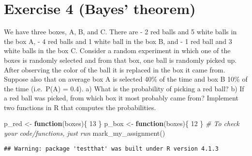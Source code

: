 \documentclass[
]{article}
\newenvironment{Shaded}{\begin{snugshade}}{\end{snugshade}}
\newcommand{\CommentTok}[1]{\textcolor[rgb]{0.56,0.35,0.01}{\textit{#1}}}
\newcommand{\ControlFlowTok}[1]{\textcolor[rgb]{0.13,0.29,0.53}{\textbf{#1}}}
\newcommand{\DecValTok}[1]{\textcolor[rgb]{0.00,0.00,0.81}{#1}}
\newcommand{\FunctionTok}[1]{\textcolor[rgb]{0.00,0.00,0.00}{#1}}
\newcommand{\NormalTok}[1]{#1}
\newcommand{\OtherTok}[1]{\textcolor[rgb]{0.56,0.35,0.01}{#1}}
\begin{document}
\hypertarget{exercise-4-bayes-theorem}{%
\section{Exercise 4 (Bayes' theorem)}\label{exercise-4-bayes-theorem}}

We have three boxes, A, B, and C. There are - 2 red balls and 5 white
balls in the box A, - 4 red balls and 1 white ball in the box B, and - 1
red ball and 3 white balls in the box C. Consider a random experiment in
which one of the boxes is randomly selected and from that box, one ball
is randomly picked up. After observing the color of the ball it is
replaced in the box it came from. Suppose also that on average box A is
selected 40\% of the time and box B 10\% of the time (i.e.~P(A) = 0.4).
a) What is the probability of picking a red ball? b) If a red ball was
picked, from which box it most probably came from? Implement two
functions in R that computes the probabilities.

\begin{Shaded}
\begin{Highlighting}[]
\NormalTok{p\_red }\OtherTok{\textless{}{-}} \ControlFlowTok{function}\NormalTok{(boxes)\{}
  \DecValTok{13}
\NormalTok{\}}
\NormalTok{p\_box }\OtherTok{\textless{}{-}} \ControlFlowTok{function}\NormalTok{(boxes)\{}
  \DecValTok{12}
\NormalTok{\}}
\CommentTok{\# To check your code/functions, just run}
\FunctionTok{mark\_my\_assignment}\NormalTok{()}
\end{Highlighting}
\end{Shaded}

\begin{verbatim}
## Warning: package 'testthat' was built under R version 4.1.3
\end{verbatim}
\end{document}
